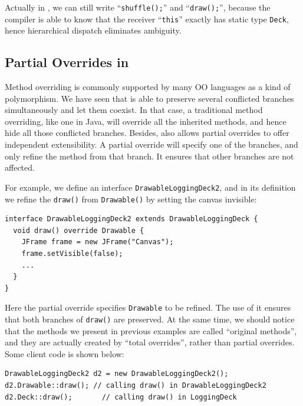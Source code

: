 Actually in \MIM{}, we can still write ``\lstinline|shuffle();|'' and ``\lstinline|draw();|'',
because the compiler is able to know that the receiver ``\lstinline|this|'' exactly has static type \lstinline|Deck|, hence hierarchical dispatch eliminates ambiguity.

\subsection{Partial Overrides in \MIM	}\label{subsec:partialoverrides}

Method overriding is commonly supported by many OO languages as a kind of polymorphism.
We have seen that \MIM{} is able to preserve several conflicted branches simultaneously and let them coexist.
In that case, a traditional method overriding, like one in Java, will override all the inherited methods, and hence
hide all those conflicted branches. Besides, \MIM{} also allows partial overrides to offer independent extensibility.
A partial override will specify one of the branches, and only refine the method from that branch. It ensures that
other branches are not affected.

For example, we define an interface \lstinline|DrawableLoggingDeck2|, and in its definition we refine the \lstinline|draw()| from \lstinline|Drawable()| by setting
the canvas invisible:
\vspace{3pt}\begin{lstlisting}
interface DrawableLoggingDeck2 extends DrawableLoggingDeck {
  void draw() override Drawable {
    JFrame frame = new JFrame("Canvas");
    frame.setVisible(false);
    ...
  }
}
\end{lstlisting}\vspace{3pt}
Here the partial override specifies \lstinline|Drawable| to be refined. The use of it ensures that both branches of \lstinline|draw()| are preserved. At the same time, we should notice that the methods we present in previous examples are called ``original methods'', and they are actually created by ``total overrides'', rather than partial overrides. Some client code is shown below: 
\vspace{3pt}\begin{lstlisting}
DrawableLoggingDeck2 d2 = new DrawableLoggingDeck2();
d2.Drawable::draw(); // calling draw() in DrawableLoggingDeck2
d2.Deck::draw();       // calling draw() in LoggingDeck
\end{lstlisting}\vspace{3pt}

